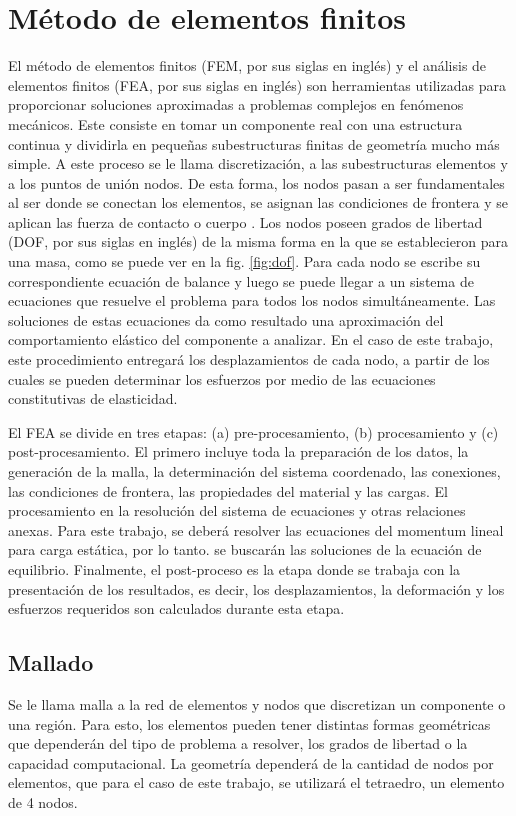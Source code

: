 \section{Método de elementos finitos}
El método de elementos finitos (FEM, por sus siglas en inglés) y el análisis de elementos finitos (FEA, por sus siglas en inglés) son herramientas utilizadas para proporcionar soluciones aproximadas a problemas complejos en fenómenos mecánicos. Este consiste en tomar un componente real con una estructura continua y dividirla en pequeñas subestructuras finitas de geometría mucho más simple. A este proceso se le llama  discretización, a las subestructuras elementos y a los puntos de unión nodos. 
De esta forma, los nodos pasan a ser fundamentales al ser donde se conectan los elementos, se asignan las condiciones de frontera y se aplican las fuerza de contacto o cuerpo \cite{budynas2008shigley}. Los nodos poseen grados de libertad (DOF, por sus siglas en inglés) de la misma forma en la que se establecieron para una masa, como se puede ver en la fig. \ref{fig:dof}. Para cada nodo se escribe su correspondiente ecuación de balance y luego se puede llegar a un sistema de ecuaciones que resuelve el problema para todos los nodos simultáneamente. Las soluciones de estas ecuaciones da como resultado una aproximación del comportamiento elástico del componente a analizar. En el caso de este trabajo, este procedimiento entregará los desplazamientos de cada nodo, a partir de los cuales se pueden determinar los esfuerzos por medio de las ecuaciones constitutivas de elasticidad.

El FEA se divide en tres etapas: (a) pre-procesamiento, (b) procesamiento y (c) post-procesamiento. El primero incluye toda la preparación de los datos, la generación de la malla, la determinación del sistema coordenado, las conexiones, las condiciones de frontera, las propiedades del material y las cargas. El procesamiento en la resolución del sistema de ecuaciones y otras relaciones anexas. Para este trabajo, se deberá resolver las ecuaciones del momentum lineal para carga estática, por lo tanto. se buscarán las soluciones de la ecuación de equilibrio.  Finalmente, el post-proceso es la etapa donde se trabaja con la presentación de los resultados, es decir, los desplazamientos, la deformación y los esfuerzos requeridos son calculados durante esta etapa. 

\subsection{Mallado}
Se le llama malla a la red de elementos y nodos que discretizan un componente o una región. Para esto, los elementos pueden tener distintas formas geométricas que dependerán del tipo de problema a resolver, los grados de libertad o la capacidad computacional. La geometría dependerá de la cantidad de nodos por elementos, que para el caso de este trabajo, se utilizará el tetraedro, un elemento de 4 nodos.

